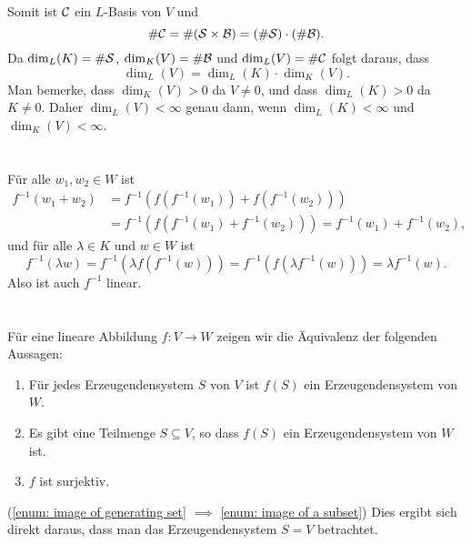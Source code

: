 \documentclass[a4paper,10pt]{scrartcl}
\begin{document}
Somit ist $\mathcal{C}$ ein $L$-Basis von $V$ und
\[
 \# \mathcal{C} = \#(\mathcal{S} \times \mathcal{B}) = (\# \mathcal{S}) \cdot (\# \mathcal{B}).
\]
Da $\dim_L(K) = \# \mathcal{S}$, $\dim_K(V) = \# \mathcal{B}$ und $\dim_L(V) = \# \mathcal{C}$ folgt daraus, dass
\[
 \dim_L(V) = \dim_L(K) \cdot \dim_K(V).
\]
Man bemerke, dass $\dim_K(V) > 0$ da $V \neq 0$, und dass $\dim_L(K) > 0$ da $K \neq 0$. Daher $\dim_L(V) < \infty$ genau dann, wenn $\dim_L(K) < \infty$ und $\dim_K(V) < \infty$.













\section{}
Für alle $w_1, w_2 \in W$ ist
\begin{align*}
 f^{-1}(w_1 + w_2)
 &= f^{-1}(f(f^{-1}(w_1)) + f(f^{-1}(w_2))) \\
 &= f^{-1}(f(f^{-1}(w_1) + f^{-1}(w_2)))
 = f^{-1}(w_1) + f^{-1}(w_2),
\end{align*}
und für alle $\lambda \in K$ und $w \in W$ ist
\[
 f^{-1}(\lambda w)
 = f^{-1}(\lambda f(f^{-1}(w)))
 = f^{-1}(f(\lambda f^{-1}(w)))
 = \lambda f^{-1}(w).
\]
Also ist auch $f^{-1}$ linear.








\section{}
Für eine lineare Abbildung $f \colon V \to W$ zeigen wir die Äquivalenz der folgenden Aussagen:

\begin{enumerate}[label=(\roman*)]
 \item\label{enum: image of generating set}
  Für jedes Erzeugendensystem $S$ von $V$ ist $f(S)$ ein Erzeugendensystem von $W$.
 \item\label{enum: image of a subset}
  Es gibt eine Teilmenge $S \subseteq V$, so dass $f(S)$ ein Erzeugendensystem von $W$ ist.
 \item\label{enum: surjective}
  $f$ ist surjektiv.
\end{enumerate}


(\ref{enum: image of generating set} $\implies$ \ref{enum: image of a subset}) Dies ergibt sich direkt daraus, dass man das Erzeugendensystem $S = V$ betrachtet.
\end{document}
